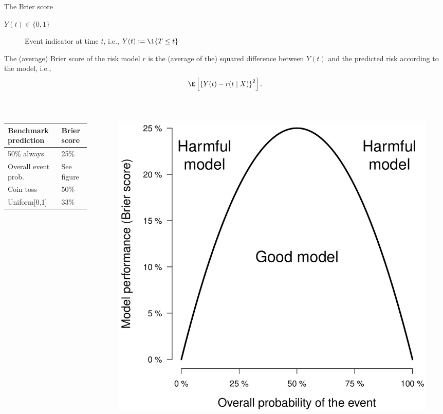 \documentclass[smaller]{beamer}\usepackage{listings}
\begin{document}
\begin{frame}[label={sec:orgd0b6528}]{The Brier score}
\begin{description}
\item[{\(Y(t) \in \{0,1\}\)}] Event indicator at time \(t\), i.e., \(Y(t):= \1\{T \leq t\}\)
\end{description}

\vfill \pause

The (average) Brier score of the risk model \(r\) is the (average of the) squared difference
between \(Y(t)\) and the predicted risk according to the model, i.e.,
\begin{equation*}
  \E\left[ 
    \left\{
      Y(t) - r(t \mid X)
    \right\}^2 \right].
\end{equation*}
\pause \vspace{-1cm}

\begin{block}{$\;$}
\begin{columns}
\begin{column}{.45\columnwidth}
\begin{center}
\begin{tabular}{ll}
Benchmark prediction & Brier score\\
\hline
50\% always & 25\%\\
Overall event prob. & See figure\\
Coin toss & 50\%\\
Uniform[0,1] & 33\%\\
\end{tabular}

\end{center}
\end{column}

\begin{column}{0.45\columnwidth}
\begin{figure}[htbp]
\centering
\includegraphics[width=.8\textwidth]{./gerds-kattan-brier-viz.png}
\citep{gerds2021medical}
\end{figure}
\end{column}
\end{columns}
\end{block}
\end{frame}
\end{document}
